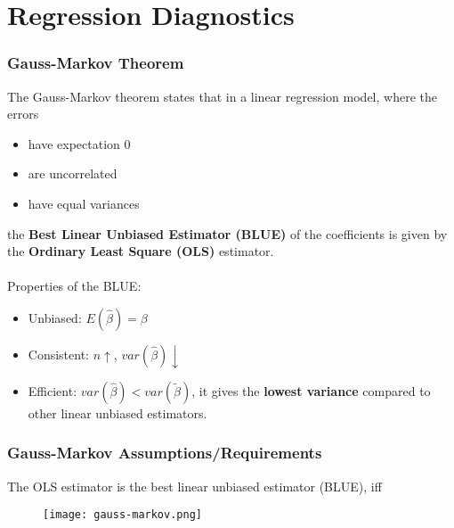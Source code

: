\newpage
\part{Regression Diagnostics}
\section{Gauss-Markov Theorem}
The Gauss-Markov theorem states that in a linear regression model, where the errors
\begin{itemize}
	\item have expectation 0
	\item are uncorrelated
	\item have equal variances
\end{itemize}
the \textbf{Best Linear Unbiased Estimator (BLUE)} of the coefficients is given by the \textbf{Ordinary Least Square (OLS)} estimator.
\\ \ \\
Properties of the BLUE:
\begin{itemize}
	\item Unbiased: $E(\hat{\beta}) = \beta$
	\item Consistent: $n \uparrow$, $var(\hat{\beta}) \downarrow$  
	\item Efficient: $var(\hat{\beta}) < var(\tilde{\beta})$, it gives the \textbf{lowest variance} compared to other linear unbiased estimators. 
\end{itemize}

\section{Gauss-Markov Assumptions/Requirements}
The OLS estimator is the best linear unbiased estimator (BLUE), iff
\begin{figure}[H]
	\centering
	\texttt{[image: gauss-markov.png]}
\end{figure}
